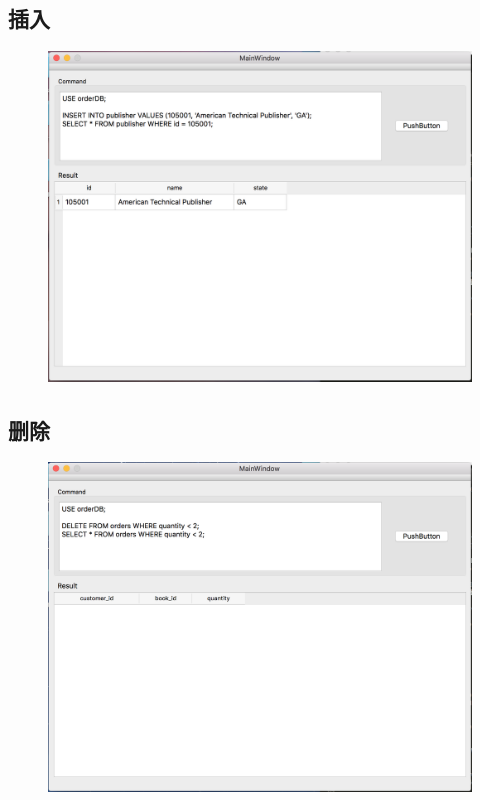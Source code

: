 \subsection{插入}
\begin{figure}[H]
\centering
\includegraphics[width=5in]{Figures/screen_shot/insert.png}
\end{figure}

\subsection{删除}
\begin{figure}[H]
\centering
\includegraphics[width=5in]{Figures/screen_shot/delete.png}
\end{figure}

